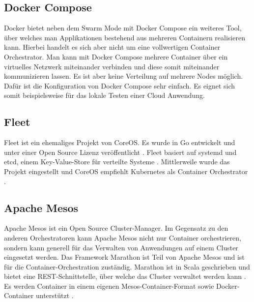 \subsection{Docker Compose}
Docker bietet neben dem Swarm Mode mit Docker Compose ein weiteres Tool, über welches man Applikationen bestehend aus mehreren Containern realisieren kann. Hierbei handelt es sich aber nicht um eine vollwertigen Container Orchestrator. Man kann mit Docker Compose mehrere Container über ein virtuelles Netzwerk miteinander verbinden und diese somit miteinander kommunizieren lassen. Es ist aber keine Verteilung auf mehrere Nodes möglich. Dafür ist die Konfiguration von Docker Compose sehr einfach. Es eignet sich somit beispielsweise für das lokale Testen einer Cloud Anwendung.

\subsection{Fleet}
Fleet ist ein ehemaliges Projekt von CoreOS. Es wurde in Go entwickelt und unter einer Open Source Lizenz veröffentlicht \cite{noauthor_fleet_2021}. Fleet basiert auf systemd und etcd, einem Key-Value-Store für verteilte Systeme \cite{noauthor_etcd_2021}. Mittlerweile wurde das Projekt eingestellt und CoreOS empfiehlt Kubernetes als Container Orchestrator \cite{noauthor_fleet_2021}.

\subsection{Apache Mesos}
Apache Mesos ist ein Open Source Cluster-Manager. Im Gegensatz zu den anderen Orchestratoren kann Apache Mesos nicht nur Container orchestrieren, sondern kann generell für das Verwalten von Anwendungen auf einem Cluster eingesetzt werden. Das Framework Marathon ist Teil von Apache Mesos und ist für die Container-Orchestration zuständig. Marathon ist in Scala geschrieben und bietet eine REST-Schnittstelle, über welche das Cluster verwaltet werden kann \cite{noauthor_marathon_2021}. Es werden Container in einem eigenen Mesos-Container-Format sowie Docker-Container unterstützt \cite{noauthor_mesosphere_2021}.

